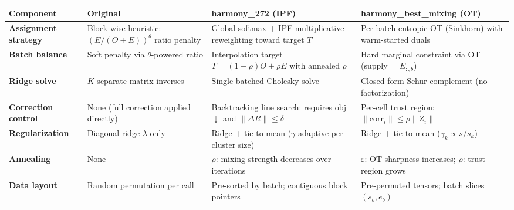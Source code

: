 \documentclass[8pt]{article}
\begin{document}
\renewcommand{\arraystretch}{1.3}
\begin{table}[ht]
\centering
\small
\begin{tabular}{@{}p{2.3cm} p{3.5cm} p{4.3cm} p{4.3cm}@{}}
\toprule
\textbf{Component} & \textbf{Original} & \textbf{harmony\_272 (IPF)} & \textbf{harmony\_best\_mixing (OT)} \\
\midrule
\textbf{Assignment strategy} &
    Block-wise heuristic: $(E/(O{+}E))^\theta$ ratio penalty &
    \textcolor{added}{Global softmax + IPF multiplicative reweighting toward target $T$} &
    \textcolor{keychange}{Per-batch entropic OT (Sinkhorn) with warm-started duals} \\
\addlinespace

\textbf{Batch balance} &
    Soft penalty via $\theta$-powered ratio &
    \textcolor{added}{Interpolation target $T = (1{-}\rho)O + \rho E$ with annealed $\rho$} &
    \textcolor{keychange}{Hard marginal constraint via OT (supply = $E_{:,b}$)} \\
\addlinespace

\textbf{Ridge solve} &
    $K$ separate matrix inverses &
    \textcolor{added}{Single batched Cholesky solve} &
    \textcolor{keychange}{Closed-form Schur complement (no factorization)} \\
\addlinespace

\textbf{Correction control} &
    None (full correction applied directly) &
    \textcolor{added}{Backtracking line search: requires obj $\downarrow$ and $\|\Delta R\| \leq \delta$} &
    \textcolor{keychange}{Per-cell trust region: $\|\text{corr}_i\| \leq \rho \|Z_i\|$} \\
\addlinespace

\textbf{Regularization} &
    Diagonal ridge $\lambda$ only &
    \textcolor{added}{Ridge + tie-to-mean ($\gamma$ adaptive per cluster size)} &
    \textcolor{keychange}{Ridge + tie-to-mean ($\gamma_k \propto \bar{s}/s_k$)} \\
\addlinespace

\textbf{Annealing} &
    None &
    \textcolor{added}{$\rho$: mixing strength decreases over iterations} &
    \textcolor{keychange}{$\varepsilon$: OT sharpness increases; $\rho$: trust region grows} \\
\addlinespace

\textbf{Data layout} &
    Random permutation per call &
    \textcolor{added}{Pre-sorted by batch; contiguous block pointers} &
    \textcolor{keychange}{Pre-permuted tensors; batch slices $(s_b, e_b)$} \\

\bottomrule
\end{tabular}
\end{table}
\end{document}
